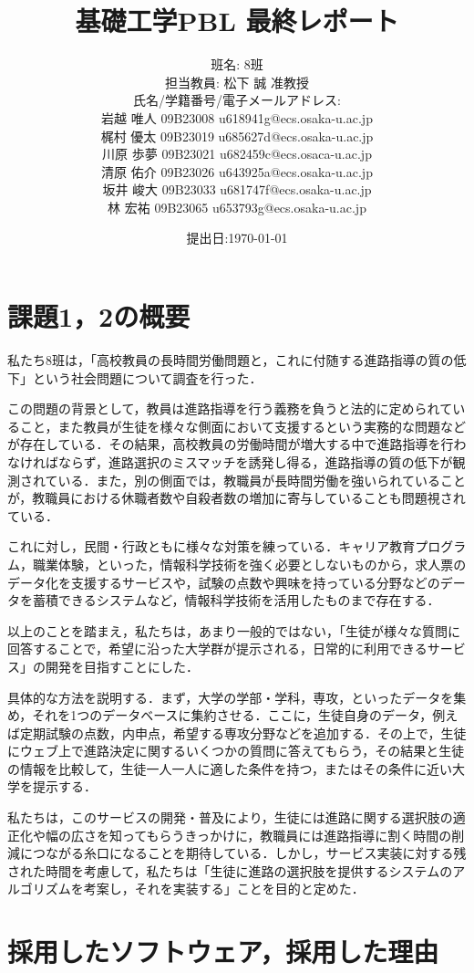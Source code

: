\documentclass[a4j, titlepage]{jarticle}
\title{基礎工学PBL 最終レポート}
\author{班名: 8班\\
担当教員: 松下 誠 准教授\\
氏名/学籍番号/電子メールアドレス:\\
岩越 唯人 09B23008 u618941g@ecs.osaka-u.ac.jp\\
梶村 優太 09B23019 u685627d@ecs.osaka-u.ac.jp\\
川原 歩夢 09B23021 u682459c@ecs.osaca-u.ac.jp\\
清原 佑介 09B23026 u643925a@ecs.osaka-u.ac.jp\\
坂井 峻大 09B23033 u681747f@ecs.osaka-u.ac.jp\\
林 宏祐 09B23065 u653793g@ecs.osaka-u.ac.jp
}
\date{提出日:\today}
\begin{document}
\maketitle

\section{課題1，2の概要}
私たち8班は，「高校教員の長時間労働問題と，これに付随する進路指導の質の低下」という社会問題について調査を行った．

この問題の背景として，教員は進路指導を行う義務を負うと法的に定められていること，また教員が生徒を様々な側面において支援するという実務的な問題などが存在している．その結果，高校教員の労働時間が増大する中で進路指導を行わなければならず，進路選択のミスマッチを誘発し得る，進路指導の質の低下が観測されている．また，別の側面では，教職員が長時間労働を強いられていることが，教職員における休職者数や自殺者数の増加に寄与していることも問題視されている．

これに対し，民間・行政ともに様々な対策を練っている．キャリア教育プログラム，職業体験，といった，情報科学技術を強く必要としないものから，求人票のデータ化を支援するサービスや，試験の点数や興味を持っている分野などのデータを蓄積できるシステムなど，情報科学技術を活用したものまで存在する．

以上のことを踏まえ，私たちは，あまり一般的ではない，「生徒が様々な質問に回答することで，希望に沿った大学群が提示される，日常的に利用できるサービス」の開発を目指すことにした．

具体的な方法を説明する．まず，大学の学部・学科，専攻，といったデータを集め，それを1つのデータベースに集約させる．ここに，生徒自身のデータ，例えば定期試験の点数，内申点，希望する専攻分野などを追加する．その上で，生徒にウェブ上で進路決定に関するいくつかの質問に答えてもらう，その結果と生徒の情報を比較して，生徒一人一人に適した条件を持つ，またはその条件に近い大学を提示する．

私たちは，このサービスの開発・普及により，生徒には進路に関する選択肢の適正化や幅の広さを知ってもらうきっかけに，教職員には進路指導に割く時間の削減につながる糸口になることを期待している．しかし，サービス実装に対する残された時間を考慮して，私たちは「生徒に進路の選択肢を提供するシステムのアルゴリズムを考案し，それを実装する」ことを目的と定めた．

\section{採用したソフトウェア，採用した理由}
\end{document}
